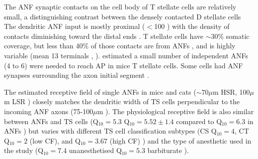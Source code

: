  The ANF synaptic contacts on the cell body of T stellate cells are relatively small,
 a distinguishing contrast between the densely contacted D stellate cells
 \citep{Cant:1981,Cant:1982,RyugoWrightEtAl:1993,TolbertMorest:1982a,FayPopper:1994,ReddCahillEtAl:2002,RyugoWrigthEtAl:1993,Ryugo:1992,RyugoParks:2003}
 The dendritic ANF input is mostly proximal ($<$100 \um) with the density of contacts
 diminishing toward the distal ends \citep{SmithRhode:1989}.  T stellate cells have
 $\sim$30\% somatic coverage, but less than 40\% of those contacts are from ANFs
 \citep{Cant:1981,Cant:1982,RyugoWrightEtAl:1993,TolbertMorest:1982a,SmithRhode:1989},
 and is highly variable (mean 13 terminals \citep*[36$\pm$10.5\% of somatic terminals in
 cat][]{SmithRhode:1989}, \citep*[0--6 terminals per soma in
 chinchilla][]{JosephsonMorest:1998}).  \citet{FerragamoGoldingEtAl:1998a} estimated
 a small number of independent ANFs (4 to 6) were needed to reach AP in mice T
 stellate cells.  Some cells had ANF synapses surrounding the axon initial segment
 \citep{JosephsonMorest:1998}.


  




 The estimated receptive field of single ANFs in mice and cats ($\sim$70$\mu$m HSR,
 100$\mu$m LSR
 \citep{OertelWuEtAl:1990,Ryugo:2008,MeltzerRyugo:2006,RyugoParks:2003,Ryugo:1992,BrownBerglundEtAl:1988,RoullierCronin-SchreiberEtAl:1986,FeketeRouillerEtAl:1984})
 closely matches the dendritic width of TS cells perpendicular to the incoming ANF
 axons (75-100$\mu$m \citep[Mouse]{OertelWuEtAl:1990}).
 The physiological receptive field is also similar between ANFs and TS cells
 (Q$_{10}=5.3$ \citep[cat][]{RhodeSmith:1986}Q$_{10}=5.52\pm1.4$ compared to
 Q$_{10}=6.3$ in ANFs \citep[guinea pig]{JiangPalmerEtAl:1996}) but varies with
 different TS cell classification subtypes (CS Q$_{10}=4$, CT Q$_{10}=2$ (low CF),
 and Q$_{10}=3.67$ (high CF) \citep[guinea pig]{PalmerWallaceEtAl:2003}) and the type
 of anesthetic used in the study (Q$_{10}=7.4$ unanesthetised Q$_{10}=5.3$
 barbiturate \citep[cat][]{RhodeKettner:1987}).

